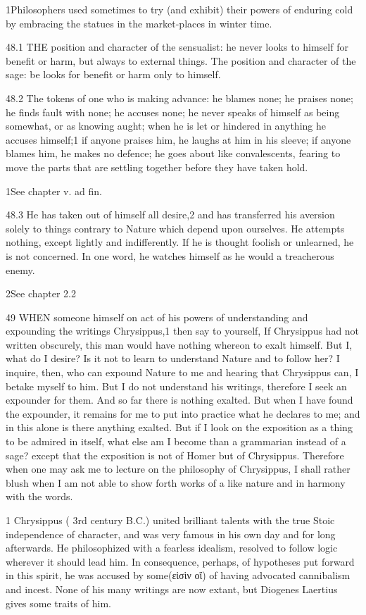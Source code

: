     1Philosophers used sometimes to try (and exhibit) their powers of enduring cold by embracing the statues in the market-places in winter time.

    48.1   THE position and character of the sensualist: he never looks to himself for benefit or harm, but always to external things. The position and character of the sage: be looks for benefit or harm only to himself.

    48.2   The tokens of one who is making advance: he blames none; he praises none; he finds fault with none; he accuses none; he never speaks of himself as being somewhat, or as knowing aught; when he is let or hindered in anything he accuses himself;1 if anyone praises him, he laughs at him in his sleeve; if anyone blames him, he makes no defence; he goes about like convalescents, fearing to move the parts that are settling together before they have taken hold.

    1See chapter v. ad fin.

    48.3   He has taken out of himself all desire,2 and has transferred his aversion solely to things contrary to Nature which depend upon ourselves. He attempts nothing, except lightly and indifferently. If he is thought foolish or unlearned, he is not concerned. In one word, he watches himself as he would a treacherous enemy.

    2See chapter 2.2

    49   WHEN someone himself on act of his powers of understanding and expounding the writings Chrysippus,1 then say to yourself, If Chrysippus had not written obscurely, this man would have nothing  whereon to exalt himself. But I, what do I desire? Is it not to learn to understand Nature and to follow her? I inquire, then, who can expound Nature to me and hearing that Chrysippus can, I betake myself to him. But I do not understand his writings, therefore I seek an expounder for them. And so far there is nothing exalted. But when I have found the expounder, it remains for me to put into practice what he declares to me; and in this alone is there anything exalted. But if I look on the exposition as a thing to be admired in itself, what else am I become than a grammarian instead of a sage? except that the exposition is not of Homer but of Chrysippus. Therefore when one may ask me to lecture on the philosophy of Chrysippus, I shall rather blush when I am not able to show forth works of a like nature and in harmony with the words.

    1 Chrysippus ( 3rd century B.C.) united brilliant talents with the true Stoic independence of character, and was very famous in his own day and for long afterwards. He philosophized with a fearless idealism, resolved to follow logic wherever it should lead him. In consequence, perhaps, of hypotheses put forward in this spirit, he was accused by some(εἰσὶν οἵ)  of having advocated cannibalism and incest. None of his many writings are now extant, but Diogenes Laertius gives some traits of him.


